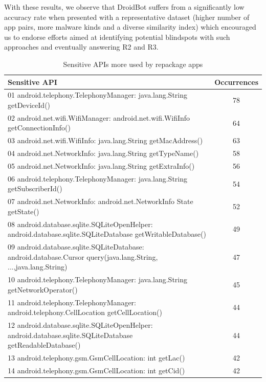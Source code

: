 With these results, we observe that DroidBot suffers from a significantly low accuracy rate when presented with a representative dataset
(higher number of app pairs, more malware kinds and a diverse similarity index) 
which encouraged us to endorse
efforts aimed at identifying potential blindspots with such approaches and eventually answering R2 and R3.

\begin{table}[t]
  \caption{Sensitive APIs more used by repackage apps}
  \centering
  \begin{small}
 \begin{tabular}{lc}
   \toprule
   Sensitive API & Occurrences \\
   \midrule
   01 android.telephony.TelephonyManager: java.lang.String getDeviceId() &  78 \\
   02 android.net.wifi.WifiManager: android.net.wifi.WifiInfo getConnectionInfo() &  64\\
   03 android.net.wifi.WifiInfo: java.lang.String getMacAddress() &  63 \\
   04 android.net.NetworkInfo: java.lang.String getTypeName() &  58 \\
   05 android.net.NetworkInfo: java.lang.String getExtraInfo() &  56 \\
   06 android.telephony.TelephonyManager: java.lang.String getSubscriberId() &  54 \\
   07 android.net.NetworkInfo: android.net.NetworkInfo State getState() &  52 \\
   08 android.database.sqlite.SQLiteOpenHelper: android.database.sqlite.SQLiteDatabase getWritableDatabase() &  49 \\
   09 android.database.sqlite.SQLiteDatabase: android.database.Cursor query(java.lang.String, ...,java.lang.String) &  47 \\
   10 android.telephony.TelephonyManager: java.lang.String getNetworkOperator() &  45\\
   11 android.telephony.TelephonyManager: android.telephony.CellLocation getCellLocation() &  44\\
   12 android.database.sqlite.SQLiteOpenHelper: android.database.sqlite.SQLiteDatabase getReadableDatabase() &  44\\
   13 android.telephony.gsm.GsmCellLocation: int getLac() &  42 \\
   14 android.telephony.gsm.GsmCellLocation: int getCid() &  42 \\
   

\end{tabular}
\end{small}
\end{table}
